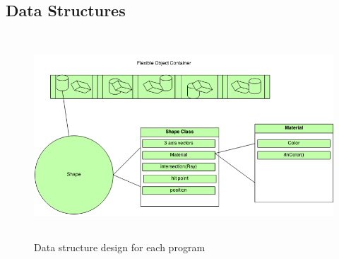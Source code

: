 \subsection{Data Structures}
\begin{figure}[ht]
\centering
\includegraphics[height=3.0in]{figures/data_structure.png}
\caption{Data structure design for each program}
\label{fig:RayTracerDataStructure}
\end{figure}

